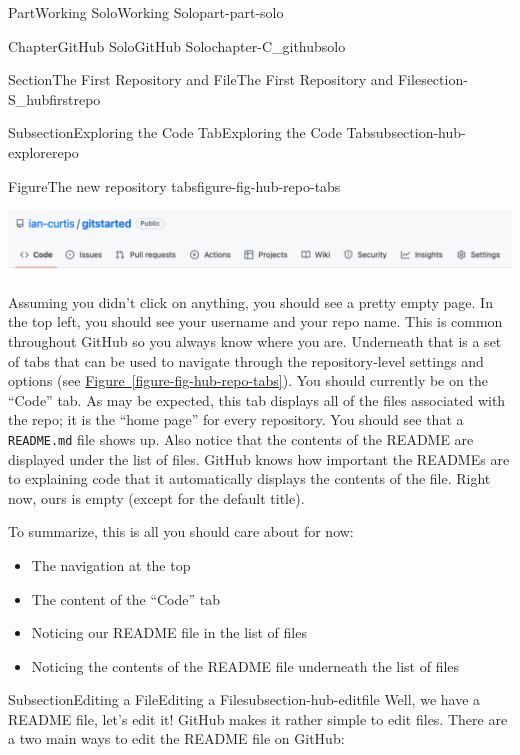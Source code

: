 \documentclass[oneside,10pt,]{book}
\newcommand{\xreffont}{\relax}
\newcommand{\mono}[1]{\texttt{#1}}
\begin{document}
\begin{partptx}{Part}{Working Solo}{}{Working Solo}{}{}{part-part-solo}
\begin{chapterptx}{Chapter}{GitHub Solo}{}{GitHub Solo}{}{}{chapter-C_githubsolo}
\begin{sectionptx}{Section}{The First Repository and File}{}{The First Repository and File}{}{}{section-S_hubfirstrepo}
\begin{subsectionptx}{Subsection}{Exploring the Code Tab}{}{Exploring the Code Tab}{}{}{subsection-hub-explorerepo}
\begin{figureptx}{Figure}{The new repository tabs}{figure-fig-hub-repo-tabs}{}
\begin{image}{0.1}{0.8}{0.1}{}%
\includegraphics[width=\linewidth]{external/hub_repo_tabs.pdf}
\end{image}%
\tcblower
\end{figureptx}%
Assuming you didn't click on anything, you should see a pretty empty page. In the top left, you should see your username and your repo name. This is common throughout GitHub so you always know where you are. Underneath that is a set of tabs that can be used to navigate through the repository-level settings and options (see \hyperref[figure-fig-hub-repo-tabs]{Figure~{\xreffont\ref{figure-fig-hub-repo-tabs}}}). You should currently be on the ``Code'' tab. As may be expected, this tab displays all of the files associated with the repo; it is the ``home page'' for every repository. You should see that a \mono{README.md} file shows up. Also notice that the contents of the README are displayed under the list of files. GitHub knows how important the READMEs are to explaining code that it automatically displays the contents of the file. Right now, ours is empty (except for the default title).%
\par
To summarize, this is all you should care about for now:%
\begin{itemize}[label=\textbullet]
\item{}The navigation at the top%
\item{}The content of the ``Code'' tab%
\item{}Noticing our README file in the list of files%
\item{}Noticing the contents of the README file underneath the list of files%
\end{itemize}
%
\end{subsectionptx}
%
%
\typeout{************************************************}
\typeout{************************************************}
%
\begin{subsectionptx}{Subsection}{Editing a File}{}{Editing a File}{}{}{subsection-hub-editfile}
%
Well, we have a README file, let's edit it! GitHub makes it rather simple to edit files. There are a two main ways to edit the README file on GitHub:%
\begin{enumerate}

\end{enumerate}
\end{subsectionptx}
\end{sectionptx}
\end{chapterptx}
\end{partptx}
\end{document}
